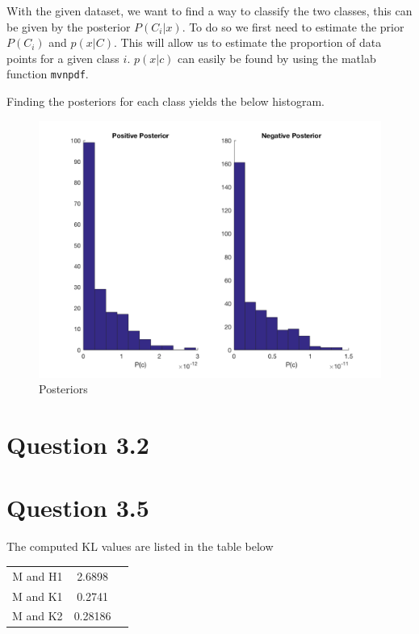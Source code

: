 With the given dataset, we want to find a way to classify the two classes, this can be given by the posterior $P(C_i|x)$. To do so we first need to estimate the prior $P(C_i)$ and $p(x|C)$. This will allow us to estimate the proportion of data points for a given class $i$.  $p(x|c)$ can easily be found by using the matlab function \texttt{mvnpdf}.

Finding the posteriors for each class yields the below histogram.

\begin{figure}[H]
    \includegraphics[width=\linewidth]{../../pracs/week4/images/q1_posteriors}
    \centering
    \caption{Posteriors}
\end{figure}

\section*{Question 3.2}

\section*{Question 3.5}

The computed KL values are listed in the table below
\begin{center}
    \begin{tabular}{|c|c|c|}
        \hline
        M and H1 & 2.6898 \\
        M and K1 & 0.2741  \\
        M and K2 & 0.28186 \\
        \hline
    \end{tabular}
\end{center}

